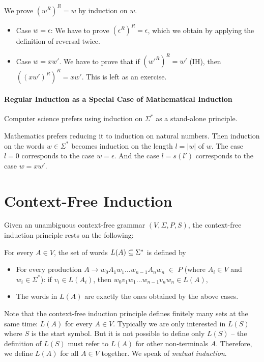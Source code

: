 \begin{example}\label{ex:induction:thm:reverse}
We prove $(w^R)^R=w$ by induction on $w$.
\begin{itemize}
 \item Case $w=\epsilon$: We have to prove $(\epsilon^R)^R=\epsilon$, which we obtain by applying the definition of reversal twice.
 \item Case $w=xw'$. We have to prove that if $(w'^R)^R=w'$ (IH), then $((xw')^R)^R=xw'$.
   This is left as an exercise.
\end{itemize}
\end{example}

\paragraph{Regular Induction as a Special Case of Mathematical Induction}
Computer science prefers using induction on $\Sigma^*$ as a stand-alone principle.

Mathematics prefers reducing it to induction on natural numbers.
Then induction on the words $w\in\Sigma^*$ becomes induction on the length $l=|w|$ of $w$.
The case $l=0$ corresponds to the case $w=\epsilon$.
And the case $l=s(l')$ corresponds to the case $w=xw'$.

\section{Context-Free Induction}\label{sec:induction:cf}

Given an unambiguous context-free grammar $(V,\Sigma,P,S)$, the context-free induction principle rests on the following:

\begin{definition}\label{def:ind:cf}
For every $A\in V$, the set of words $L(A)\subseteq\Sigma^*$ is defined by
 \begin{itemize}
   \item For every production $A\to w_0A_1w_1\ldots w_{n-1}A_n w_n \;\in\;P$ (where $A_i\in V$ and $w_i\in\Sigma^*$): if $v_i\in L(A_i)$, then $w_0 v_1 w_1\ldots w_{n-1}v_n w_n\in L(A)$,
   \item The words in $L(A)$ are exactly the ones obtained by the above cases.
 \end{itemize}
\end{definition}

\begin{remark}
Note that the context-free induction principle defines finitely many sets at the same time: $L(A)$ for every $A\in V$.
Typically we are only interested in $L(S)$ where $S$ is the start symbol.
But it is not possible to define only $L(S)$ -- the definition of $L(S)$ must refer to $L(A)$ for other non-terminals $A$.
Therefore, we define $L(A)$ for all $A\in V$ together.
We speak of \emph{mutual induction}.
\end{remark}


